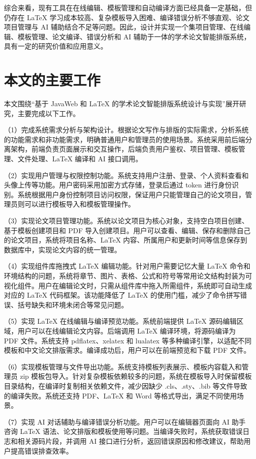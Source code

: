 \documentclass{xduugthesis}
\begin{document}
综合来看，现有工具在在线编辑、模板管理和自动编译方面已经具备一定基础，但仍存在 LaTeX 学习成本较高、复杂模板导入困难、编译错误分析不够直观、论文项目管理与 AI 辅助结合不足等问题。因此，设计并实现一个集项目管理、在线编辑、模板管理、论文编译、错误分析和 AI 辅助于一体的学术论文智能排版系统，具有一定的研究价值和应用意义。

\section{本文的主要工作}
本文围绕“基于 JavaWeb 和 LaTeX 的学术论文智能排版系统设计与实现”展开研究，主要完成以下工作。

（1）完成系统需求分析与架构设计。根据论文写作与排版的实际需求，分析系统的功能需求和非功能需求，明确普通用户和管理员的使用场景。系统采用前后端分离架构，前端负责页面展示和交互操作，后端负责用户鉴权、项目管理、模板管理、文件处理、LaTeX 编译和 AI 接口调用。

（2）实现用户管理与权限控制功能。系统支持用户注册、登录、个人资料查看和头像上传等功能。用户密码采用加密方式存储，登录后通过 token 进行身份识别。系统根据用户身份控制项目访问权限，保证用户只能管理自己的论文项目，管理员则可以进行模板导入和模板管理操作。

（3）实现论文项目管理功能。系统以论文项目为核心对象，支持空白项目创建、基于模板创建项目和 PDF 导入创建项目。用户可以查看、编辑、保存和删除自己的论文项目，系统将项目名称、LaTeX 内容、所属用户和更新时间等信息保存到数据库中，实现论文内容的统一管理。

（4）实现组件库拖拽式 LaTeX 编辑功能。针对用户需要记忆大量 LaTeX 命令和环境结构的问题，系统将章节、图片、表格、公式和符号等常用论文结构封装为可视化组件。用户在编辑论文时，只需从组件库中拖入所需组件，系统即可自动生成对应的 LaTeX 代码框架。该功能降低了 LaTeX 的使用门槛，减少了命令拼写错误、括号缺失和环境未闭合等常见问题。

（5）实现 LaTeX 在线编辑与编译预览功能。系统前端提供 LaTeX 源码编辑区域，用户可以在线编辑论文内容。后端调用 LaTeX 编译环境，将源码编译为 PDF 文件。系统支持 pdflatex、xelatex 和 lualatex 等多种编译引擎，以适配不同模板和中文论文排版需求。编译成功后，用户可以在前端预览和下载 PDF 文件。

（6）实现模板管理与文件导出功能。系统支持模板列表展示、模板内容载入和管理员 zip 模板包导入。针对复杂模板依赖较多的问题，系统在模板导入时保留模板目录结构，在编译时复制相关依赖文件，减少因缺少 .cls、.sty、.bib 等文件导致的编译失败。系统还支持 PDF、LaTeX 和 Word 等格式导出，满足不同使用场景。

（7）实现 AI 对话辅助与编译错误分析功能。用户可以在编辑器页面向 AI 助手咨询 LaTeX 语法、论文排版和模板使用等问题。当编译失败时，系统获取错误日志和相关源码片段，并调用 AI 接口进行分析，返回错误原因和修改建议，帮助用户提高错误排查效率。
\end{document}
